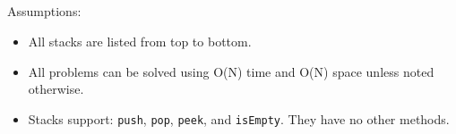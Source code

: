 \documentclass{article}
\begin{document}
\subsection*{}

Assumptions:

\begin{itemize}
  \item All stacks are listed from top to bottom.
  \item All problems can be solved using O(N) time and O(N) space unless noted otherwise.
  \item Stacks support: \texttt{push}, \texttt{pop}, \texttt{peek}, and \texttt{isEmpty}. They have no other methods.
\end{itemize}
    
\subsection*{}
\end{document}
